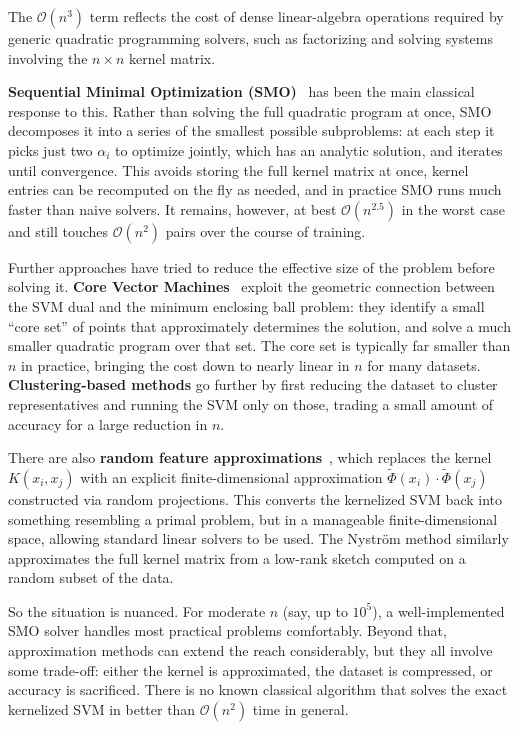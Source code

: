 \documentclass[12pt,a4paper]{article}
\begin{document}
The $\mathcal{O}(n^3)$ term reflects the cost of dense linear-algebra
operations required by generic quadratic programming solvers, such as
factorizing and solving systems involving the $n \times n$ kernel matrix.

\textbf{Sequential Minimal Optimization (SMO)}~\cite{Platt99} has been the main classical response to this. Rather than solving the full quadratic
program at once, SMO decomposes it into a series of the smallest possible
subproblems: at each step it picks just two $\alpha_i$ to optimize jointly,
which has an analytic solution, and iterates until convergence. This avoids
storing the full kernel matrix at once,  kernel entries can be recomputed
on the fly as needed,  and in practice SMO runs much faster than naive
solvers. It remains, however, at best $\mathcal{O}(n^{2.5})$ in the worst
case and still touches $\mathcal{O}(n^2)$ pairs over the course of training.

Further approaches have tried to reduce the effective size of the problem
before solving it. \textbf{Core Vector Machines}~\cite{Tsang05} exploit the
geometric connection between the SVM dual and the minimum enclosing ball
problem: they identify a small ``core set'' of points that approximately
determines the solution, and solve a much smaller quadratic program over
that set. The core set is typically far smaller than $n$ in practice,
bringing the cost down to nearly linear in $n$ for many datasets.
\textbf{Clustering-based methods} go further by first reducing the dataset
to cluster representatives and running the SVM only on those, trading a
small amount of accuracy for a large reduction in $n$.

There are also \textbf{random feature approximations}~\cite{Rahimi07},
which replaces the kernel $K(x_i, x_j)$ with an explicit finite-dimensional
approximation $\tilde{\Phi}(x_i) \cdot \tilde{\Phi}(x_j)$ constructed via
random projections. This converts the kernelized SVM back into something
resembling a primal problem, but in a manageable finite-dimensional space,
allowing standard linear solvers to be used. The Nyström method similarly
approximates the full kernel matrix from a low-rank sketch computed on a
random subset of the data.

So the situation is nuanced. For moderate $n$ (say, up to $10^5$), a
well-implemented SMO solver handles most practical problems comfortably.
Beyond that, approximation methods can extend the reach considerably,
but they all involve some trade-off: either the kernel is approximated,
the dataset is compressed, or accuracy is sacrificed. There is no known
classical algorithm that solves the exact kernelized SVM in better than
$\mathcal{O}(n^2)$ time in general.
\end{document}

